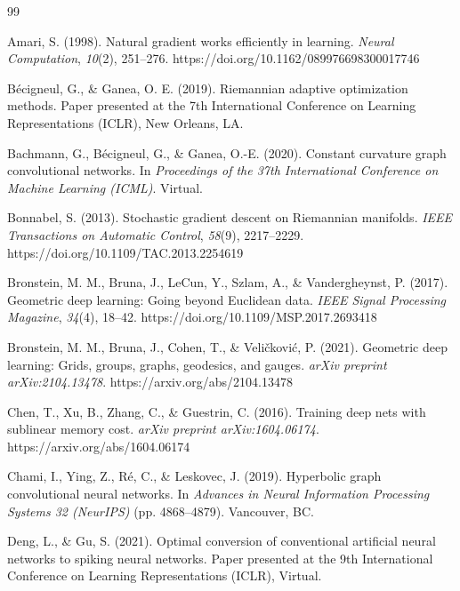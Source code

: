 \documentclass[a4paper,fleqn]{cas-dc}
\begin{document}
\begin{thebibliography}{99}

Amari, S. (1998). Natural gradient works efficiently in learning. \textit{Neural Computation}, \textit{10}(2), 251--276. https://doi.org/10.1162/089976698300017746

B\'ecigneul, G., \& Ganea, O. E. (2019). Riemannian adaptive optimization methods. Paper presented at the 7th International Conference on Learning Representations (ICLR), New Orleans, LA.

Bachmann, G., B\'ecigneul, G., \& Ganea, O.-E. (2020). Constant curvature graph convolutional networks. In \textit{Proceedings of the 37th International Conference on Machine Learning (ICML)}. Virtual.

Bonnabel, S. (2013). Stochastic gradient descent on Riemannian manifolds. \textit{IEEE Transactions on Automatic Control}, \textit{58}(9), 2217--2229. https://doi.org/10.1109/TAC.2013.2254619

Bronstein, M. M., Bruna, J., LeCun, Y., Szlam, A., \& Vandergheynst, P. (2017). Geometric deep learning: Going beyond Euclidean data. \textit{IEEE Signal Processing Magazine}, \textit{34}(4), 18--42. https://doi.org/10.1109/MSP.2017.2693418

Bronstein, M. M., Bruna, J., Cohen, T., \& Veli\v{c}kovi\'c, P. (2021). Geometric deep learning: Grids, groups, graphs, geodesics, and gauges. \textit{arXiv preprint arXiv:2104.13478}. https://arxiv.org/abs/2104.13478

Chen, T., Xu, B., Zhang, C., \& Guestrin, C. (2016). Training deep nets with sublinear memory cost. \textit{arXiv preprint arXiv:1604.06174}. https://arxiv.org/abs/1604.06174

Chami, I., Ying, Z., R\'e, C., \& Leskovec, J. (2019). Hyperbolic graph convolutional neural networks. In \textit{Advances in Neural Information Processing Systems 32 (NeurIPS)} (pp. 4868--4879). Vancouver, BC.

Deng, L., \& Gu, S. (2021). Optimal conversion of conventional artificial neural networks to spiking neural networks. Paper presented at the 9th International Conference on Learning Representations (ICLR), Virtual.


\end{thebibliography}
\end{document}

